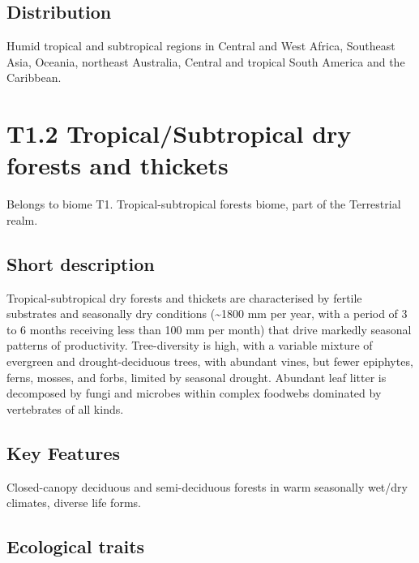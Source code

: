 \documentclass[
  letterpaper,
  DIV=11,
  numbers=noendperiod]{scrartcl}
\begin{document}
\subsection{Distribution}\label{distribution-69}

Humid tropical and subtropical regions in Central and West Africa,
Southeast Asia, Oceania, northeast Australia, Central and tropical South
America and the Caribbean.

\section{T1.2 Tropical/Subtropical dry forests and
thickets}\label{t1.2-tropicalsubtropical-dry-forests-and-thickets}

Belongs to biome T1. Tropical-subtropical forests biome, part of the
Terrestrial realm.

\subsection{Short description}\label{short-description-70}

Tropical-subtropical dry forests and thickets are characterised by
fertile substrates and seasonally dry conditions (\textasciitilde1800 mm
per year, with a period of 3 to 6 months receiving less than 100 mm per
month) that drive markedly seasonal patterns of productivity.
Tree-diversity is high, with a variable mixture of evergreen and
drought-deciduous trees, with abundant vines, but fewer epiphytes,
ferns, mosses, and forbs, limited by seasonal drought. Abundant leaf
litter is decomposed by fungi and microbes within complex foodwebs
dominated by vertebrates of all kinds.

\subsection{Key Features}\label{key-features-70}

Closed-canopy deciduous and semi-deciduous forests in warm seasonally
wet/dry climates, diverse life forms.

\subsection{Ecological traits}\label{ecological-traits-70}
\end{document}
